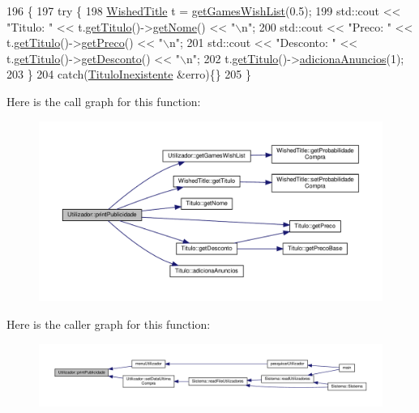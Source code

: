 \begin{DoxyCode}
196                                  \{
197     \textcolor{keywordflow}{try} \{
198         \hyperlink{classWishedTitle}{WishedTitle} t = \hyperlink{classUtilizador_a9b80c93b8e8f7716e4ab77b2e1b47071}{getGamesWishList}(0.5);
199         std::cout << \textcolor{stringliteral}{"Titulo: "} << t.\hyperlink{classWishedTitle_a9ca6e92a26bb2f319a39d5a03b0c42bd}{getTitulo}()->\hyperlink{classTitulo_acb79279860b3404c6419697df5f860cb}{getNome}() << \textcolor{stringliteral}{"\(\backslash\)n"};
200         std::cout << \textcolor{stringliteral}{"Preco: "} << t.\hyperlink{classWishedTitle_a9ca6e92a26bb2f319a39d5a03b0c42bd}{getTitulo}()->\hyperlink{classTitulo_a93725bdc2e98350e47b54fd76c0fa236}{getPreco}() << \textcolor{stringliteral}{"\(\backslash\)n"};
201         std::cout << \textcolor{stringliteral}{"Desconto: "} << t.\hyperlink{classWishedTitle_a9ca6e92a26bb2f319a39d5a03b0c42bd}{getTitulo}()->\hyperlink{classTitulo_ae7df7d468f8220fa32b2772df4c53081}{getDesconto}() << \textcolor{stringliteral}{"\(\backslash\)n"};
202         t.\hyperlink{classWishedTitle_a9ca6e92a26bb2f319a39d5a03b0c42bd}{getTitulo}()->\hyperlink{classTitulo_a8004d12b8ae0d0746b999a6411df150c}{adicionaAnuncios}(1);
203     \}
204     \textcolor{keywordflow}{catch}(\hyperlink{classTituloInexistente}{TituloInexistente} &erro)\{\}
205 \}
\end{DoxyCode}
Here is the call graph for this function\+:
\nopagebreak
\begin{figure}[H]
\begin{center}
\leavevmode
\includegraphics[width=350pt]{classUtilizador_a4f3016ff86d68d548f801aa569b854dc_cgraph}
\end{center}
\end{figure}
Here is the caller graph for this function\+:
\nopagebreak
\begin{figure}[H]
\begin{center}
\leavevmode
\includegraphics[width=350pt]{classUtilizador_a4f3016ff86d68d548f801aa569b854dc_icgraph}
\end{center}
\end{figure}
\mbox{\label{classUtilizador_aa47c2fe835a73a23664149ccc7fbc10f}} 
